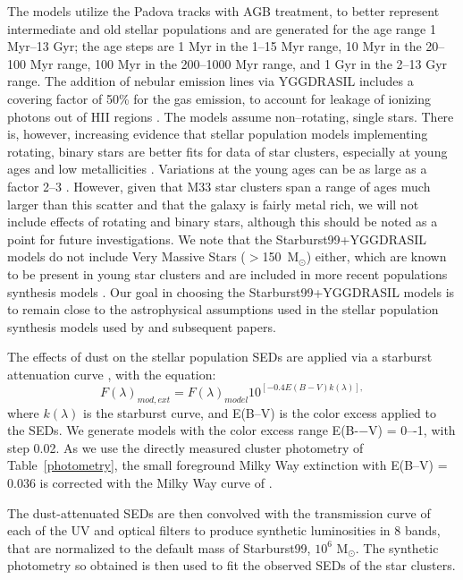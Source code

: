 \documentclass{aastex63}
\begin{document}
The models utilize the Padova tracks with AGB treatment, to better represent intermediate and old stellar populations  \citep{Girardi+2000, Vazquez+2005} and are generated for the age range 1 Myr–13 Gyr; the age steps are 1 Myr in the 1–15 Myr range, 10 Myr in the 20–100 Myr range, 100 Myr in the 200–1000 Myr range, and 1 Gyr in the 2--13 Gyr range. The addition of nebular emission lines via YGGDRASIL \citep{Zackrisson+2011} includes a covering factor of 50\% for the gas emission, to account for leakage of ionizing photons out of HII regions \citep[e.g.,][]{Calzetti+2021}. The models assume non--rotating, single stars. There is, however, increasing evidence that stellar population models implementing rotating, binary stars are better fits for data of star clusters, especially at young ages and low metallicities \citep{Stanway+2020}. Variations  at the young ages can be as large as a factor 2--3 \citep{Wofford+2016}. However, given that M33 star clusters span a range of ages much larger than this scatter and that the galaxy is fairly metal rich, we will not include effects of rotating and binary stars, although this should be noted as a point for future investigations. 
We note that the Starburst99+YGGDRASIL models do not include Very Massive Stars ($>$150~M$_{\odot}$) either, which are known to be present in young star clusters \citep[e.g.][]{Crowther+2010, Smith+2016} and are included in more recent populations synthesis models \citep[e.g. BPASS, ][]{Eldridge+2017, Stanway+2018}. Our goal in choosing the Starburst99+YGGDRASIL models is to remain close to the astrophysical assumptions used in the stellar population synthesis models used by \citet{Ma+2001} and subsequent papers.
 
The effects of dust on the stellar population SEDs are applied via a starburst attenuation curve \citep{Calzetti+2000}, with the equation:
\begin{equation}
    F(\lambda)_{mod,ext} = F(\lambda)_{model}10^{[-0.4E(B-V)k(\lambda)],}
    \label{fore_dust}
\end{equation}
where $k(\lambda)$ is the starburst curve, and E(B--V) is the color excess applied to the SEDs. We generate models with the color excess range E(B-−V) = 0–-1, with step 0.02. As we use the directly measured cluster photometry of Table~\ref{photometry}, the small foreground Milky Way extinction with E(B--V) = 0.036 is corrected with the Milky Way curve of \citet{Fitzpatrick1999}.

The dust-attenuated SEDs are then convolved with the transmission curve of each of the UV and optical filters to produce synthetic luminosities in 8 bands, that are normalized to the default mass of Starburst99, $10^{6}$ M$_{\odot}$. The synthetic photometry so obtained is then used to fit the observed SEDs of the star  clusters. 
\end{document}
